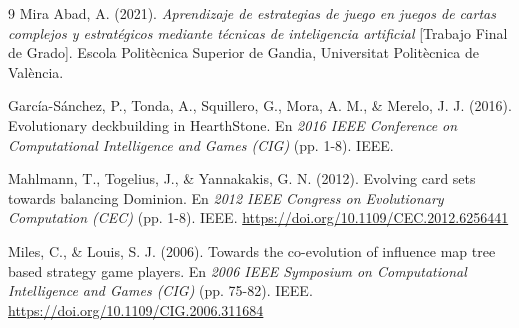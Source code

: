 \begin{thebibliography}{9}
Mira Abad, A. (2021). \textit{Aprendizaje de estrategias de juego en juegos de cartas complejos y estratégicos mediante técnicas de inteligencia artificial} [Trabajo Final de Grado]. Escola Politècnica Superior de Gandia, Universitat Politècnica de València.

García-Sánchez, P., Tonda, A., Squillero, G., Mora, A. M., \& Merelo, J. J. (2016). Evolutionary deckbuilding in HearthStone. En \textit{2016 IEEE Conference on Computational Intelligence and Games (CIG)} (pp. 1-8). IEEE.

Mahlmann, T., Togelius, J., \& Yannakakis, G. N. (2012). Evolving card sets towards balancing Dominion. En \textit{2012 IEEE Congress on Evolutionary Computation (CEC)} (pp. 1-8). IEEE. \url{https://doi.org/10.1109/CEC.2012.6256441}

Miles, C., \& Louis, S. J. (2006). Towards the co-evolution of influence map tree based strategy game players. En \textit{2006 IEEE Symposium on Computational Intelligence and Games (CIG)} (pp. 75-82). IEEE. \url{https://doi.org/10.1109/CIG.2006.311684}

\end{thebibliography}
